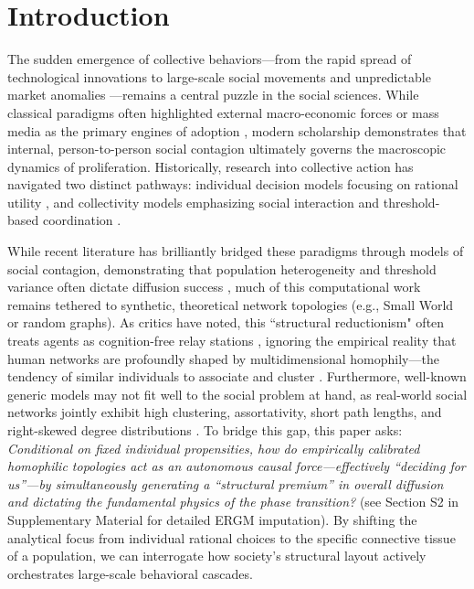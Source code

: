\documentclass[5p,twocolumn,authoryear]{elsarticle}
\begin{document}
\section{Introduction}

The sudden emergence of collective behaviors---from the rapid spread of technological innovations to large-scale social movements and unpredictable market anomalies \citep{gladwell2002, farrell1998}---remains a central puzzle in the social sciences. While classical paradigms often highlighted external macro-economic forces or mass media as the primary engines of adoption \citep{bass1969, guidolin2010}, modern scholarship demonstrates that internal, person-to-person social contagion ultimately governs the macroscopic dynamics of proliferation. Historically, research into collective action has navigated two distinct pathways: individual decision models focusing on rational utility \citep{oliver1993}, and collectivity models emphasizing social interaction and threshold-based coordination \citep{granovetter1978, valente1996}.

While recent literature has brilliantly bridged these paradigms through models of social contagion, demonstrating that population heterogeneity and threshold variance often dictate diffusion success \citep{valente2020}, much of this computational work remains tethered to synthetic, theoretical network topologies (e.g., Small World or random graphs). As critics have noted, this ``structural reductionism" often treats agents as cognition-free relay stations \citep{goldberg2021}, ignoring the empirical reality that human networks are profoundly shaped by multidimensional homophily---the tendency of similar individuals to associate and cluster \citep{mcpherson2001, mcpherson2019}. Furthermore, well-known generic models may not fit well to the social problem at hand, as real-world social networks jointly exhibit high clustering, assortativity, short path lengths, and right-skewed degree distributions \citep{talaga2020}. To bridge this gap, this paper asks: \textit{Conditional on fixed individual propensities, how do empirically calibrated homophilic topologies act as an autonomous causal force---effectively ``deciding for us''---by simultaneously generating a ``structural premium'' in overall diffusion and dictating the fundamental physics of the phase transition?} (see Section S2 in Supplementary Material for detailed ERGM imputation). By shifting the analytical focus from individual rational choices to the specific connective tissue of a population, we can interrogate how society's structural layout actively orchestrates large-scale behavioral cascades.
\end{document}
